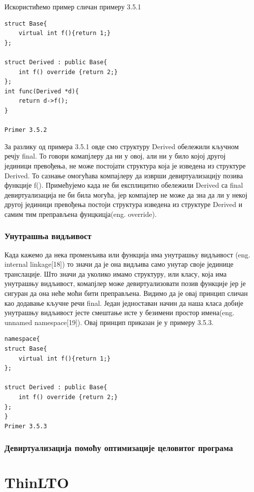 \documentclass[12pt,oneside]{memoir}
\begin{document}
 Искористићемо пример сличан примеру 3.5.1
 
\begin{lstlisting}
struct Base{
    virtual int f(){return 1;}
};

struct Derived : public Base{
    int f() override {return 2;}
};
int func(Derived *d){
    return d->f();
}

Primer 3.5.2
\end{lstlisting}
 
 За разлику од примера 3.5.1 овде смо структуру Derived обележили кључном 
 речју final.
 То говори комапјлеру да ни у овој, али ни у било којој другој јединици превођења, 
 не може постојати структура која је изведена из структуре Derived.
 То сазнање омогућава компајлеру да изврши девиртуализацију позива функције f().
 Примећујемо када не би експлицитно обележили  Derived са final девиртуализација
 не би била могућа, јер компајлер не може да зна да ли у некој другој јединици превођења
 постоји структура изведена из структуре Derived и самим тим преправљена фунцкицја(eng. override).
 
 \subsection{Унутрашња видљивост}
 Када кажемо да нека променљива или функција има унутрашњу видљивост
 (eng. internal linkage[18]) то значи да је она видљива само унутар своје јединице
 транслације.
 Што значи да уколико имамо структуру, или класу, која има унутрашњу видљивост,
 комапјлер може девиртуализовати позив функције јер је сигуран да она неће моћи бити
 преправљена.
 Видимо да је овај принцип сличан као додавање кључне речи  final.
 Један једноставан начин да наша класа добије унутрашњу видљивост јесте смештање исте
 у безимени простор имена(eng. unnamed namespace[19]).
 Овај принцип приказан је у примеру 3.5.3.
 
 \begin{lstlisting}
namespace{
struct Base{
    virtual int f(){return 1;}
};

struct Derived : public Base{
    int f() override {return 2;}
};
}
Primer 3.5.3
\end{lstlisting}
 
\subsection{Девиртуализација помоћу оптимизације целовитог програма}
 
 
 \chapter{ThinLTO}
 
\end{document}
